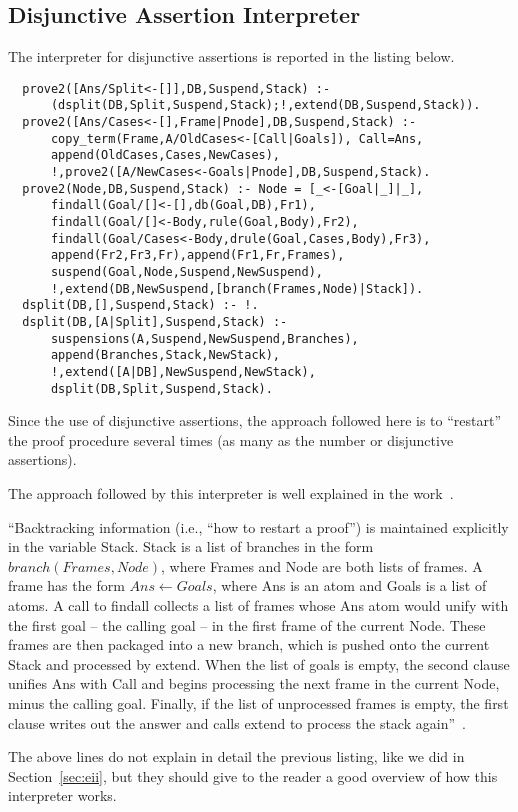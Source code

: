 \subsection{Disjunctive Assertion Interpreter}
\label{sec:dai}
The interpreter for disjunctive assertions is reported in the listing below.

\begin{lstlisting}
  prove2([Ans/Split<-[]],DB,Suspend,Stack) :-
      (dsplit(DB,Split,Suspend,Stack);!,extend(DB,Suspend,Stack)).
  prove2([Ans/Cases<-[],Frame|Pnode],DB,Suspend,Stack) :-
      copy_term(Frame,A/OldCases<-[Call|Goals]), Call=Ans,
      append(OldCases,Cases,NewCases),
      !,prove2([A/NewCases<-Goals|Pnode],DB,Suspend,Stack).
  prove2(Node,DB,Suspend,Stack) :- Node = [_<-[Goal|_]|_],
      findall(Goal/[]<-[],db(Goal,DB),Fr1),
      findall(Goal/[]<-Body,rule(Goal,Body),Fr2),
      findall(Goal/Cases<-Body,drule(Goal,Cases,Body),Fr3),
      append(Fr2,Fr3,Fr),append(Fr1,Fr,Frames),
      suspend(Goal,Node,Suspend,NewSuspend),
      !,extend(DB,NewSuspend,[branch(Frames,Node)|Stack]).
  dsplit(DB,[],Suspend,Stack) :- !.
  dsplit(DB,[A|Split],Suspend,Stack) :-
      suspensions(A,Suspend,NewSuspend,Branches),
      append(Branches,Stack,NewStack),
      !,extend([A|DB],NewSuspend,NewStack),
      dsplit(DB,Split,Suspend,Stack).
\end{lstlisting}

Since the use of disjunctive assertions, the approach followed here is to ``restart'' the
proof procedure several times (as many as the number or disjunctive assertions).

The approach followed by this interpreter is well explained in the work~\cite{McCartyS94}.

``Backtracking information (i.e., ``how to restart a proof'') is maintained explicitly in the variable Stack.
Stack is a list of branches in the form $branch(Frames,Node)$, where Frames and Node are both
lists of frames. A frame has the form $Ans \leftarrow Goals$, where Ans is an atom and Goals is a list of
atoms. A call to findall collects a list of frames whose Ans atom
would unify with the first goal -- the calling goal -- in the first frame of the current Node. These
frames are then packaged into a new branch, which is pushed onto the current Stack and processed
by extend. When the list of goals is empty, the second clause unifies Ans with Call and
begins processing the next frame in the current Node, minus the calling goal. Finally, if the list
of unprocessed frames is empty, the first clause writes out the answer and calls extend
to process the stack again''~\cite{McCartyS94}.

The above lines do not explain in detail the previous listing, like we did in
Section~\ref{sec:eii}, but they should give to the reader a good overview of how this
interpreter works.
